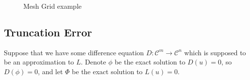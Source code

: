 \documentclass[../main.tex]{subfiles}
\begin{document}
  \begin{figure}[ht]
    \centering
    \caption{Mesh Grid example}\label{fde:fig:mesh}
  \end{figure}

  \subsection{Truncation Error}\label{sec:fdes:truncation}
  Suppose that we have some difference equation $D : \mathcal{C}^m \to \mathcal{C}^n$ which is supposed to be an approximation to $L$. Denote $\phi$ be the exact solution to $D(u) = 0$, so $D(\phi) = 0$, and let $\Phi$ be the exact solution to $L(u) = 0$.
\end{document}
